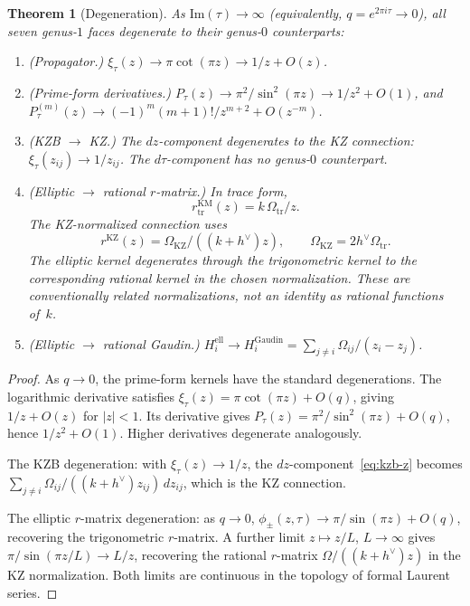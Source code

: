 \documentclass[11pt]{article}
\theoremstyle{plain}
\newtheorem{theorem}{Theorem}[section]
\theoremstyle{definition}
\theoremstyle{remark}
\numberwithin{equation}{section}
\begin{document}
\begin{theorem}[Degeneration]\label{thm:degeneration}
As $\mathrm{Im}(\tau) \to \infty$ (equivalently,
$q = e^{2\pi i\tau} \to 0$), all seven genus-$1$ faces degenerate to
their genus-$0$ counterparts:
\begin{enumerate}[label=\textup{(\roman*)}]
\item \textup{(Propagator.)}
\(\xi_\tau(z) \to \pi\cot(\pi z) \to 1/z + O(z)\).

\item \textup{(Prime-form derivatives.)}
\(P_\tau(z) \to \pi^2/\sin^2(\pi z) \to 1/z^2 + O(1)\), and
\(P_\tau^{(m)}(z) \to (-1)^m(m+1)!/z^{m+2} + O(z^{-m})\).

\item \textup{(KZB $\to$ KZ.)} The $dz$-component degenerates to
the KZ connection: \(\xi_\tau(z_{ij}) \to 1/z_{ij}\). The
$d\tau$-component has no genus-$0$ counterpart.

\item \textup{(Elliptic $\to$ rational $r$-matrix.)}
In trace form,
\[
r^{\mathrm{KM}}_{\mathrm{tr}}(z)=k\,\Omega_{\mathrm{tr}}/z.
\]
The KZ-normalized connection uses
\[
r^{\mathrm{KZ}}(z)=\Omega_{\mathrm{KZ}}/((k+h^\vee)z),
\qquad
\Omega_{\mathrm{KZ}}=2h^\vee\Omega_{\mathrm{tr}}.
\]
The elliptic kernel degenerates through the trigonometric kernel to
the corresponding rational kernel in the chosen normalization. These
are conventionally related normalizations, not an identity as rational
functions of~$k$.

\item \textup{(Elliptic $\to$ rational Gaudin.)}
$H_i^{\mathrm{ell}} \to H_i^{\mathrm{Gaudin}} = \sum_{j \neq i}
\Omega_{ij}/(z_i - z_j)$.
\end{enumerate}
\end{theorem}

\begin{proof}
As \(q\to0\), the prime-form kernels have the standard degenerations.
The logarithmic derivative satisfies
\(\xi_\tau(z)=\pi\cot(\pi z)+O(q)\), giving \(1/z+O(z)\) for
\(|z|<1\). Its derivative gives
\(P_\tau(z)=\pi^2/\sin^2(\pi z)+O(q)\), hence \(1/z^2+O(1)\). Higher
derivatives degenerate analogously.

The KZB degeneration: with \(\xi_\tau(z) \to 1/z\), the
$dz$-component~\eqref{eq:kzb-z} becomes
$\sum_{j \neq i}\Omega_{ij}/((k+h^\vee)z_{ij})\,dz_{ij}$, which is
the KZ connection.

The elliptic $r$-matrix degeneration: as $q \to 0$,
$\phi_\pm(z,\tau) \to \pi/\sin(\pi z) + O(q)$, recovering the
trigonometric $r$-matrix. A further limit
$z \mapsto z/L$, $L \to \infty$ gives $\pi/\sin(\pi z/L) \to L/z$,
recovering the rational $r$-matrix
$\Omega/((k+h^\vee)z)$ in the KZ normalization.
Both limits are continuous in the topology of formal Laurent series.
\end{proof}
\end{document}
